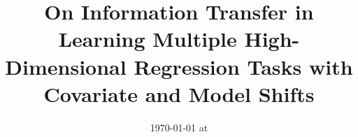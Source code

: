\documentclass{article}
\begin{document}
\title{On Information Transfer in Learning Multiple High-Dimensional Regression Tasks with Covariate and Model Shifts}
\date{}
\maketitle
\date{{\ddmmyyyydate\today} at \currenttime}





%





\appendix





\end{document}
